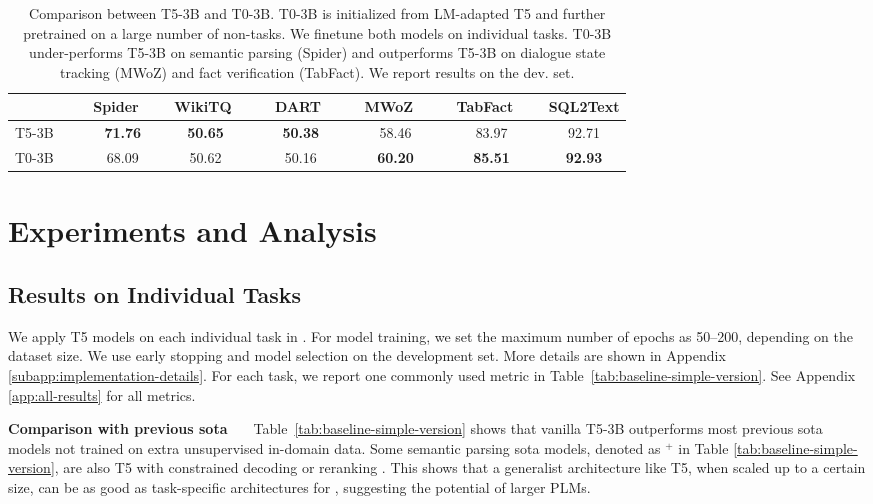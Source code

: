 \begin{table*}[ht]
\begin{minipage}{\textwidth}
{	    }
	\label{tab:baseline-simple-version}
	\end{minipage}
\end{table*}\begin{table}[t]
\small
	\centering
	\begin{adjustbox}{width=0.98\linewidth}
		\begin{tabular}{@{}l@{}c@{}c@{}c@{}c@{}c@{}c@{}}
			\toprule
			& Spider \ & \ WikiTQ \ & \ \ DART \ \ &  \ MWoZ \ \ &  \ TabFact \ \ & SQL2Text \\ 
			\midrule 
		    T5-3B \ \ \ & \bf 71.76 & \bf 50.65 & \bf 50.38 & 58.46 & 83.97 & 92.71 \\
            T0-3B & 68.09 & 50.62 & 50.16 & \bf 60.20 & \bf 85.51 & \bf 92.93 \\
			\bottomrule
		\end{tabular}
	\end{adjustbox}
	\caption{Comparison between T5-3B and T0-3B. T0-3B is initialized from LM-adapted T5 and further pretrained on a large number of non-\skg tasks. We finetune both models on individual tasks.
	T0-3B under-performs T5-3B on semantic parsing (Spider) and outperforms T5-3B on dialogue state tracking (MWoZ) and fact verification (TabFact). We report results on the dev. set. }
	\vspace{-3mm}
	\label{tab:t0}
\end{table}

\section{Experiments and Analysis}
\label{sec:results}

\subsection{Results on Individual Tasks} 
\label{subsec:baseline-performance}
We apply T5 models \cite{2020t5} on each individual task in \uskg.
For model training, we set the maximum number of epochs as 50--200, depending on the dataset size. We use early stopping and model selection on the development set. 
More details are shown in Appendix \ref{subapp:implementation-details}. 
For each task, we report one commonly used metric in Table~\ref{tab:baseline-simple-version}. See Appendix \ref{app:all-results} for all metrics. 

\noindent\textbf{Comparison with previous sota \ \ }
Table~\ref{tab:baseline-simple-version} shows that vanilla T5-3B outperforms most previous sota models not trained on extra unsupervised in-domain data.  
Some semantic parsing sota models, denoted as $^{+}$ in Table \ref{tab:baseline-simple-version}, are also T5 with constrained decoding \cite{Scholak2021:PICARD} or reranking \cite{ye2021rng}. 
This shows that a generalist architecture like T5, when scaled up to a certain size, can be as good as task-specific architectures for \skg, suggesting the potential of larger PLMs. 

